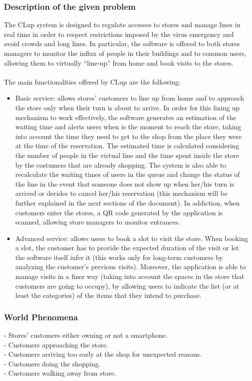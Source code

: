 \documentclass{article}
\begin{document}
\subsubsection{Description of the given problem}
The CLup system is designed to regulate accesses to stores and manage lines in real time in order to respect restrictions imposed by the virus emergency and avoid crowds and long lines. In particular, the software is offered to both stores managers to monitor the influx of people in their buildings and to common users, allowing them to virtually “line-up” from home and book visits to the stores.\\
\smallskip\\
The main functionalities offered by CLup are the following:\\
\begin{itemize}
\item Basic service: allows stores' customers to line up from home and to approach the store only when their turn is about to arrive. In order for this lining up mechanism to work effectively, the software generates an estimation of the waiting time and alerts users when is the moment to reach the store, taking into account the time they need to get to the shop from the place they were at the time of the reservation. The estimated time is calculated considering the number of people in the virtual line and the time spent inside the store by the costumers that are already shopping. The system is also able to recalculate the waiting times of users in the queue and change the status of the line in the event that someone does not show up when her/his turn is arrived or decides to cancel her/his reservation (this mechanism will be further explained in the next sections of the document). In addiction, when customers enter the stores, a QR code generated by the application is scanned, allowing store managers to monitor entrances.
\item Advanced service: allows users to book a slot to visit the store. When booking a slot, the customer has to provide the expected duration of the visit or let the software itself infer it (this works only for long-term customers by analyzing the customer’s previous visits). Moreover, the application is able to manage visits in a finer way (taking into account the spaces in the store that customers are going to occupy), by allowing users to indicate the list (or at least the categories) of the items that they intend to purchase.
\end{itemize}
\subsubsection{World Phenomena}
\noindent\medskip
[WP1] - Stores’ customers either owning or not a smartphone.\\
\noindent\medskip
[WP2] - Customers approaching the store.\\
\noindent\medskip
[WP3] - Customers arriving too early at the shop for unexpected reasons.\\
\noindent\medskip
[WP4] - Customers doing the shopping.\\
\noindent\medskip
[WP5] - Customers walking away from store.
\end{document}
